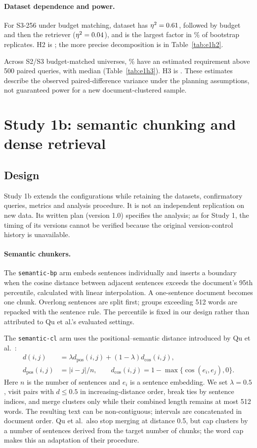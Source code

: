\documentclass[11pt]{article}
\newcommand{\chunk}[1]{\texttt{#1}}
\begin{document}
\paragraph{Dataset dependence and power.}
For S3-256 under budget matching, dataset has $\eta^2=0.61$, followed by budget and then the retriever ($\eta^2=0.04$), and is the largest factor in \HTwoFraction\% of bootstrap replicates. H2 is \HTwoVerdict; the more precise decomposition is in Table~\ref{tab:e1h2}.

Across S2/S3 budget-matched universes, \HThreeShare\% have an estimated requirement above 500 paired queries, with median \HThreeMedianN{} (Table~\ref{tab:e1h3}). H3 is \HThreeVerdict. These estimates describe the observed paired-difference variance under the planning assumptions, not guaranteed power for a new document-clustered sample.
\section{Study 1b: semantic chunking and dense retrieval}\label{sec:study1b}
\subsection{Design}
Study 1b extends the configurations while retaining the datasets, confirmatory queries, metrics and analysis procedure. It is not an independent replication on new data. Its written plan (version 1.0) specifies the analysis; as for Study 1, the timing of its versions cannot be verified because the original version-control history is unavailable.

\paragraph{Semantic chunkers.}
The \chunk{semantic-bp} arm embeds sentences individually and inserts a boundary when the cosine distance between adjacent sentences exceeds the document's 95th percentile, calculated with linear interpolation. A one-sentence document becomes one chunk. Overlong sentences are split first; groups exceeding 512 words are repacked with the sentence rule. The percentile is fixed in our design rather than attributed to Qu et al.'s evaluated settings.

The \chunk{semantic-cl} arm uses the positional--semantic distance introduced by Qu et al.~\cite{qu2025semanticchunking}:
\begin{align}
d(i,j)&=\lambda d_{\mathrm{pos}}(i,j)+(1-\lambda)d_{\mathrm{cos}}(i,j),\\
d_{\mathrm{pos}}(i,j)&=|i-j|/n,\qquad d_{\mathrm{cos}}(i,j)=1-\max\{\cos(e_i,e_j),0\}.
\end{align}
Here $n$ is the number of sentences and $e_i$ is a sentence embedding. We set $\lambda=0.5$, visit pairs with $d\leq0.5$ in increasing-distance order, break ties by sentence indices, and merge clusters only while their combined length remains at most 512 words. The resulting text can be non-contiguous; intervals are concatenated in document order. Qu et al.\ also stop merging at distance 0.5, but cap clusters by a number of sentences derived from the target number of chunks; the word cap makes this an adaptation of their procedure.
\end{document}
